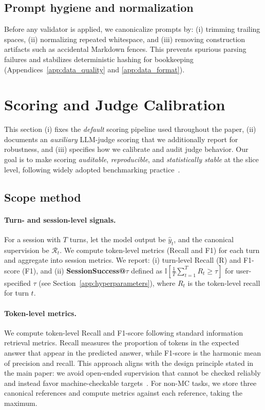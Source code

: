 \subsection{Prompt hygiene and normalization}
\label{app:prompts_hygiene}

Before any validator is applied, we canonicalize prompts by:
(i) trimming trailing spaces, (ii) normalizing repeated whitespace, and (iii) removing construction artifacts such as accidental Markdown fences.
This prevents spurious parsing failures and stabilizes deterministic hashing for bookkeeping (Appendices~\ref{app:data_quality} and \ref{app:data_format}).
\endgroup
\section{Scoring and Judge Calibration}
\label{app:scoring}

This section (i) fixes the \emph{default} scoring pipeline used throughout the paper, (ii) documents an \emph{auxiliary} LLM-judge scoring that we additionally report for robustness, and (iii) specifies how we calibrate and audit judge behavior. Our goal is to make scoring \emph{auditable}, \emph{reproducible}, and \emph{statistically stable} at the slice level, following widely adopted benchmarking practice~\citep{liang2022helm,kiela-etal-2021-dynabench,zhou2023instruction,chiang-etal-2024-chatbotarena}.

\subsection{Scope method}
\label{app:scoring_scope}

\paragraph{Turn- and session-level signals.}
For a session with $T$ turns, let the model output be $\hat{y}_t$, and the canonical supervision be $\mathcal{R}_t$. We compute token-level metrics (Recall and F1) for each turn and aggregate into session metrics.
We report: (i) turn-level Recall (R) and F1-score (F1), and (ii) \textbf{SessionSuccess@$\tau$} defined as $\mathbb{I}[\frac{1}{T}\sum_{t=1}^T R_t \ge \tau]$ for user-specified $\tau$ (see Section~\ref{app:hyperparameters}), where $R_t$ is the token-level recall for turn $t$.

\paragraph{Token-level metrics.}
We compute token-level Recall and F1-score following standard information retrieval metrics.
Recall measures the proportion of tokens in the expected answer that appear in the predicted answer, while F1-score is the harmonic mean of precision and recall.
This approach aligns with the design principle stated in the main paper: we avoid open-ended supervision that cannot be checked reliably and instead favor machine-checkable targets~\citep{liang2022helm,kiela-etal-2021-dynabench}.
For non-MC tasks, we store three canonical references and compute metrics against each reference, taking the maximum.

